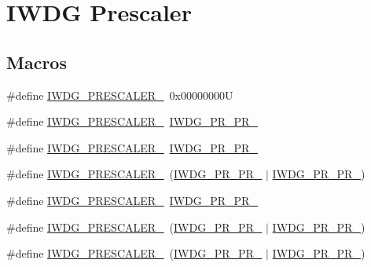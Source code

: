 \hypertarget{group___i_w_d_g___prescaler}{}\section{I\+W\+DG Prescaler}
\label{group___i_w_d_g___prescaler}
\subsection*{Macros}
\begin{DoxyCompactItemize}
\item 
\#define \hyperlink{group___i_w_d_g___prescaler_ga470bb195d35ef7a0b75164c228b4ee69}{I\+W\+D\+G\+\_\+\+P\+R\+E\+S\+C\+A\+L\+E\+R\+\_}~0x00000000U
\item 
\#define \hyperlink{group___i_w_d_g___prescaler_ga5f00866f823ee700005e8a753b28ad75}{I\+W\+D\+G\+\_\+\+P\+R\+E\+S\+C\+A\+L\+E\+R\+\_}~\hyperlink{group___peripheral___registers___bits___definition_ga9b727e7882603df1684cbf230520ca76}{I\+W\+D\+G\+\_\+\+P\+R\+\_\+\+P\+R\+\_}
\item 
\#define \hyperlink{group___i_w_d_g___prescaler_gab3eb3c6a10facc8b0dc7c33608f6e129}{I\+W\+D\+G\+\_\+\+P\+R\+E\+S\+C\+A\+L\+E\+R\+\_}~\hyperlink{group___peripheral___registers___bits___definition_gafba2551b90c68d95c736a116224b473e}{I\+W\+D\+G\+\_\+\+P\+R\+\_\+\+P\+R\+\_}
\item 
\#define \hyperlink{group___i_w_d_g___prescaler_gac3f33494fb7aaa2845ac106858394e03}{I\+W\+D\+G\+\_\+\+P\+R\+E\+S\+C\+A\+L\+E\+R\+\_}~(\hyperlink{group___peripheral___registers___bits___definition_gafba2551b90c68d95c736a116224b473e}{I\+W\+D\+G\+\_\+\+P\+R\+\_\+\+P\+R\+\_} $\vert$ \hyperlink{group___peripheral___registers___bits___definition_ga9b727e7882603df1684cbf230520ca76}{I\+W\+D\+G\+\_\+\+P\+R\+\_\+\+P\+R\+\_})
\item 
\#define \hyperlink{group___i_w_d_g___prescaler_ga52a956c645ce59312c84cbe37b2b20e4}{I\+W\+D\+G\+\_\+\+P\+R\+E\+S\+C\+A\+L\+E\+R\+\_}~\hyperlink{group___peripheral___registers___bits___definition_ga55a1d7fde4e3e724a8644652ba9bb2b9}{I\+W\+D\+G\+\_\+\+P\+R\+\_\+\+P\+R\+\_}
\item 
\#define \hyperlink{group___i_w_d_g___prescaler_ga17901d4e3e52af620acbbb146fd79264}{I\+W\+D\+G\+\_\+\+P\+R\+E\+S\+C\+A\+L\+E\+R\+\_}~(\hyperlink{group___peripheral___registers___bits___definition_ga55a1d7fde4e3e724a8644652ba9bb2b9}{I\+W\+D\+G\+\_\+\+P\+R\+\_\+\+P\+R\+\_} $\vert$ \hyperlink{group___peripheral___registers___bits___definition_ga9b727e7882603df1684cbf230520ca76}{I\+W\+D\+G\+\_\+\+P\+R\+\_\+\+P\+R\+\_})
\item 
\#define \hyperlink{group___i_w_d_g___prescaler_ga885221d5bb09157c9e953a1be38556f0}{I\+W\+D\+G\+\_\+\+P\+R\+E\+S\+C\+A\+L\+E\+R\+\_}~(\hyperlink{group___peripheral___registers___bits___definition_ga55a1d7fde4e3e724a8644652ba9bb2b9}{I\+W\+D\+G\+\_\+\+P\+R\+\_\+\+P\+R\+\_} $\vert$ \hyperlink{group___peripheral___registers___bits___definition_gafba2551b90c68d95c736a116224b473e}{I\+W\+D\+G\+\_\+\+P\+R\+\_\+\+P\+R\+\_})
\end{DoxyCompactItemize}



